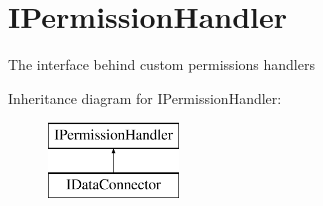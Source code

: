 \hypertarget{interfaceOTA_1_1Data_1_1IPermissionHandler}{}\section{I\+Permission\+Handler}
\label{interfaceOTA_1_1Data_1_1IPermissionHandler}


The interface behind custom permissions handlers  


Inheritance diagram for I\+Permission\+Handler\+:\begin{figure}[H]
\begin{center}
\leavevmode
\includegraphics[height=2.000000cm]{interfaceOTA_1_1Data_1_1IPermissionHandler}
\end{center}
\end{figure}
